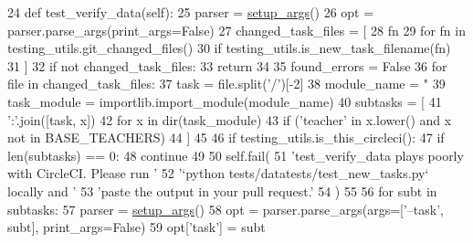 \begin{DoxyCode}
24     \textcolor{keyword}{def }test\_verify\_data(self):
25         parser = \hyperlink{namespaceparlai_1_1chat__service_1_1services_1_1browser__chat_1_1client_a20c9862417d1f1a61b06551de0820ee4}{setup\_args}()
26         opt = parser.parse\_args(print\_args=\textcolor{keyword}{False})
27         changed\_task\_files = [
28             fn
29             \textcolor{keywordflow}{for} fn \textcolor{keywordflow}{in} testing\_utils.git\_changed\_files()
30             \textcolor{keywordflow}{if} testing\_utils.is\_new\_task\_filename(fn)
31         ]
32         \textcolor{keywordflow}{if} \textcolor{keywordflow}{not} changed\_task\_files:
33             \textcolor{keywordflow}{return}
34 
35         found\_errors = \textcolor{keyword}{False}
36         \textcolor{keywordflow}{for} file \textcolor{keywordflow}{in} changed\_task\_files:
37             task = file.split(\textcolor{stringliteral}{'/'})[-2]
38             module\_name = \textcolor{stringliteral}{"%
39             task\_module = importlib.import\_module(module\_name)
40             subtasks = [
41                 \textcolor{stringliteral}{':'}.join([task, x])
42                 \textcolor{keywordflow}{for} x \textcolor{keywordflow}{in} dir(task\_module)
43                 \textcolor{keywordflow}{if} (\textcolor{stringliteral}{'teacher'} \textcolor{keywordflow}{in} x.lower() \textcolor{keywordflow}{and} x \textcolor{keywordflow}{not} \textcolor{keywordflow}{in} BASE\_TEACHERS)
44             ]
45 
46             \textcolor{keywordflow}{if} testing\_utils.is\_this\_circleci():
47                 \textcolor{keywordflow}{if} len(subtasks) == 0:
48                     \textcolor{keywordflow}{continue}
49 
50                 self.fail(
51                     \textcolor{stringliteral}{'test\_verify\_data plays poorly with CircleCI. Please run '}
52                     \textcolor{stringliteral}{'`python tests/datatests/test\_new\_tasks.py` locally and '}
53                     \textcolor{stringliteral}{'paste the output in your pull request.'}
54                 )
55 
56             \textcolor{keywordflow}{for} subt \textcolor{keywordflow}{in} subtasks:
57                 parser = \hyperlink{namespaceparlai_1_1chat__service_1_1services_1_1browser__chat_1_1client_a20c9862417d1f1a61b06551de0820ee4}{setup\_args}()
58                 opt = parser.parse\_args(args=[\textcolor{stringliteral}{'--task'}, subt], print\_args=\textcolor{keyword}{False})
59                 opt[\textcolor{stringliteral}{'task'}] = subt
}
\end{DoxyCode}
